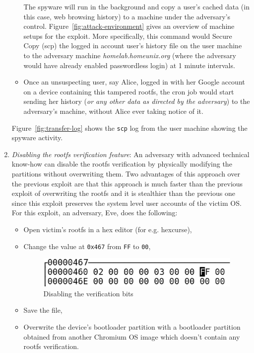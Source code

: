 \documentclass[11pt]{article}
\begin{document}
\begin{enumerate}
\begin{itemize}
The spyware will run in the background and copy a user's cached data (in this case, web browsing history) to a machine under the adversary's control. Figure~\ref{fig:attack-environment} gives an overview of machine setups for the exploit. More specifically, this command would Secure Copy (scp) the logged in account user's history file on the user machine to the adversary machine \textit{homelab.homeunix.org} (where the adversary would have already enabled passwordless login) at 1 minute intervals. 
\item Once an unsuspecting user, say Alice, logged in with her Google account on a device containing this tampered rootfs, the cron job would start sending her history (\emph{or any other data as directed by the adversary}) to the adversary's machine, without Alice ever taking notice of it. 

\end{itemize}

Figure~\ref{fig:transfer-log} shows the \texttt{scp} log from the user machine showing the spyware activity. 

\item \emph{Disabling the rootfs verification feature}: An adversary with advanced technical know-how can disable the rootfs verification by physically modifying the partitions without overwriting them. Two advantages of this approach over the previous exploit are that this approach is much faster than the previous exploit of overwriting the rootfs and it is stealthier than the previous one since this exploit preserves the system level user accounts of the victim OS.
For this exploit, an adversary, Eve, does the following:

\begin{itemize}

\item Open victim's rootfs in a hex editor (for e.g. hexcurse),
\item Change the value at \texttt{0x467} from \texttt{FF} to \texttt{00},

\begin{figure}[htbp]
  \centering
   \includegraphics[scale=0.3]{Figure/hex-attack.eps}
\caption{\small{Disabling the verification bits}}
\label{fig:hex-attack}
\end{figure}
\item Save the file,
\item Overwrite the device's bootloader partition with a bootloader partition obtained from another Chromium OS image which doesn't contain any rootfs verification.
\end{itemize}


\end{enumerate}
\end{document}
